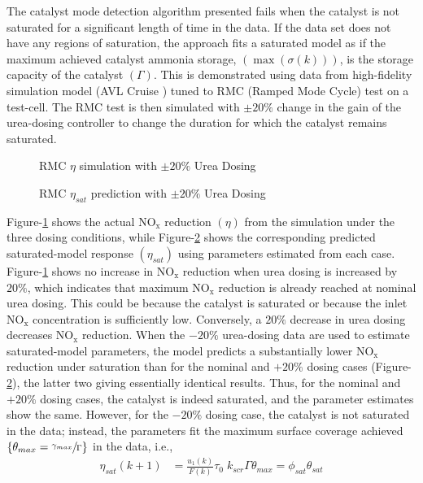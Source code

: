 \documentclass[subscriptcorrection,upint,varvw,barcolor=Goldenrod3,mathalfa=cal=euler,balance,hyphenate,french,pdf-a]{asmejour}
\newcommand{\lr}[1]{\left( #1 \right)}
\newcommand{\lrf}[1]{\left\{ #1 \right\}}
\newcommand{\figWidth}{0.45\textwidth}
\newcommand{\nox}{\text{NO}_{\text{x}}}
\begin{document}
The catalyst mode detection algorithm presented fails when the catalyst is not saturated for a
significant length of time in the data. If the data set does not have any regions of saturation, the approach fits a
saturated model as if the maximum achieved catalyst ammonia storage, $(\max\lr{\sigma(k)})$, is the storage capacity of
the catalyst $(\Gamma)$. This is demonstrated using data from high-fidelity simulation model (AVL Cruise
\cite{AVLCruise}) tuned to RMC (Ramped Mode Cycle) test on a test-cell. The RMC test is then simulated with $\pm 20\%$
change in the gain of the urea-dosing controller to change the duration for which the catalyst remains saturated.
\begin{figure}[ht]
        \centering
        \caption{RMC $\eta$ simulation with $\pm 20\%$ Urea Dosing}
        \label{fig::necessary_cond_sim}
\end{figure}
\begin{figure}[ht]
        \centering
        \caption{RMC $\eta_{sat}$ prediction with $\pm 20\%$ Urea Dosing}
        \label{fig::necessary_cond_sat}
\end{figure}
Figure-\ref{fig::necessary_cond_sim} shows the actual $\nox$ reduction $(\eta)$ from the simulation under the three dosing conditions, while Figure-\ref{fig::necessary_cond_sat} shows the corresponding predicted saturated-model response $(\eta_{sat})$ using parameters estimated from each case.
Figure-\ref{fig::necessary_cond_sim} shows no increase in $\nox$ reduction when urea dosing is increased by $20\%$,
which indicates that maximum $\nox$ reduction is already reached at nominal urea dosing. This could be because the
catalyst is saturated or because the inlet $\nox$ concentration is sufficiently low. Conversely, a $20\%$ decrease in
urea dosing decreases $\nox$ reduction. When the $-20\%$ urea-dosing data are used to estimate saturated-model
parameters, the model predicts a substantially lower $\nox$ reduction under saturation than for the nominal and $+20\%$
dosing cases (Figure-\ref{fig::necessary_cond_sat}), the latter two giving essentially identical results. Thus, for the nominal and $+20\%$ dosing cases, the catalyst is indeed saturated, and the parameter estimates show the same. However, for the $-20\%$ dosing case, the catalyst is not saturated in the data; instead, the parameters fit the maximum surface coverage achieved $\lrf{\theta_{max} = \sfrac{\gamma_{max}}{\Gamma}}$ in the data, i.e.,
\begin{align}
        \eta_{sat}(k+1) & = \frac{u_1(k)}{F(k)} \tau_0 \; k_{scr} \Gamma \theta_{max} = \phi_{sat} \theta_{sat}
\end{align}
\end{document}
